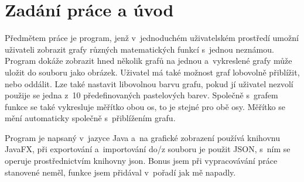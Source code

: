 \chapter*{Zadání práce a úvod}
Předmětem práce je program, jenž v~jednoduchém uživatelském prostředí umožní uživateli zobrazit grafy různých matematických funkcí s~jednou neznámou.
Program dokáže zobrazit hned několik grafů na jednou a~vykreslené grafy může uložit do souboru jako obrázek.
Uživatel má také možnost graf lobovolně přiblížit, nebo oddálit.
Lze také nastavit libovolnou barvu grafu, pokud jí uživatel nezvolí použije se jedna z~10 předefinovaných pastelových barev.
Společně s~grafem funkce se také vykresluje měřítko obou os, to je stejné pro obě osy.
Měřítko se mění automaticky společně s~přiblížením grafu.

Program je napsaný v~jazyce Java a~na grafické zobrazení používá knihovnu JavaFX, při exportování a~importování do/z souboru je použit JSON, s~ním se operuje prostřednictvím knihovny json.
Bonus jsem při vypracovávání práce stanovené neměl, funkce jsem přidával v~pořadí jak mě napadly.


